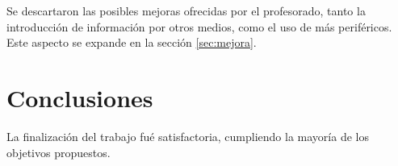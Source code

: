\documentclass[12pt,letterpaper]{article}
\begin{document}
Se descartaron las posibles mejoras ofrecidas por el profesorado,
tanto la introducción de información por otros medios, como el uso de
más periféricos. Este aspecto se expande en la sección
\ref{sec:mejora}.
\section{Conclusiones}
La finalización del trabajo fué satisfactoria, cumpliendo la mayoría
de los objetivos propuestos.
\end{document}
